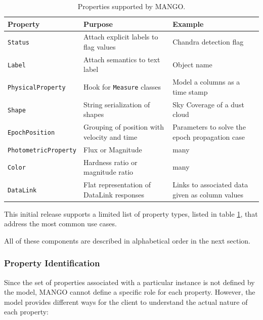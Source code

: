 \documentclass[11pt,a4paper]{ivoa}
\begin{document}
\begin{table}[h!]
\small
\begin{center}
\begin{tabular}{|| p{3.5cm} | p{3.5cm} |  p{3.5cm} ||} 
 \hline\hline
 \textbf{Property} & \textbf{Purpose} & \textbf{Example} \\ 
  \hline\hline
 \texttt{Status} & Attach explicit labels to flag values & Chandra detection flag  \\ 
 \hline
 \texttt{Label} & Attach semantics to text label & Object name \\
 \hline
 \texttt{PhysicalProperty} & Hook for \texttt{Measure} classes & Model a columns as a time stamp \\
 \hline
 \texttt{Shape} & String serialization of shapes & Sky Coverage of a dust cloud \\
 \hline
 \texttt{EpochPosition} & Grouping of position with velocity and time & Parameters to solve the epoch propagation case\\  
 \hline
 \texttt{PhotometricProperty} & Flux or Magnitude & many \\ 
 \hline
 \texttt{Color} & Hardness ratio or magnitude ratio & many  \\ [1ex] 
 \hline
 \texttt{DataLink} & Flat representation of DataLink responses & Links to associated data given as column values\\ [1ex] 
 \hline
\end{tabular}
\caption{Properties supported by MANGO.}
\label{table:properties}
\end{center}
 \end{table}
This initial release supports a limited list of property types, listed in table \ref{table:properties}, that address the most common use cases.



All of these components are described in alphabetical order in the next section.

\subsubsection{Property Identification}
Since the set of properties associated with a particular instance is not defined by the model,
MANGO cannot define a specific role for each property. However, the model provides different ways
for the client to understand the actual nature of each property:
\end{document}
